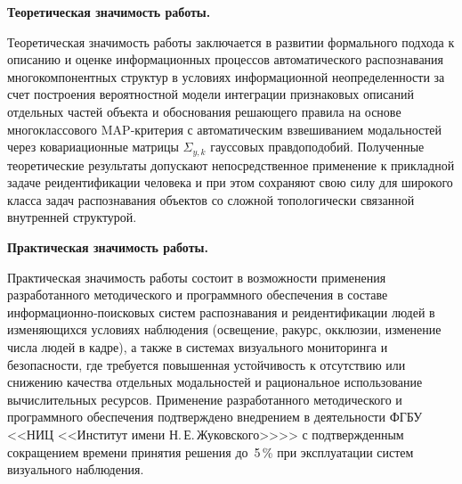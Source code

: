 \textbf{Теоретическая значимость работы.}

Теоретическая значимость работы заключается в развитии формального подхода
к описанию и оценке информационных процессов автоматического распознавания
многокомпонентных структур в условиях информационной неопределенности
за счет построения вероятностной модели интеграции признаковых описаний
отдельных частей объекта и обоснования решающего правила на основе
многоклассового MAP‑критерия с автоматическим взвешиванием
модальностей через ковариационные матрицы $\Sigma_{y,k}$ гауссовых
правдоподобий. Полученные теоретические результаты допускают непосредственное
применение к прикладной задаче реидентификации человека и при этом
сохраняют свою силу для широкого класса задач распознавания объектов со
сложной топологически связанной внутренней структурой.

\textbf{Практическая значимость работы.}

Практическая значимость работы состоит в возможности применения
разработанного методического и программного обеспечения в составе
информационно‑поисковых систем распознавания и реидентификации людей в
изменяющихся условиях наблюдения (освещение, ракурс, окклюзии,
изменение числа людей в кадре), а также в системах визуального
мониторинга и безопасности, где требуется повышенная устойчивость к
отсутствию или снижению качества отдельных модальностей и рациональное
использование вычислительных ресурсов. Применение разработанного
методического и программного обеспечения подтверждено внедрением
в деятельности ФГБУ <<НИЦ <<Институт имени Н.\,Е.\,Жуковского>>>>
с подтвержденным сокращением времени принятия решения до~5\,\% при
эксплуатации систем визуального наблюдения.

